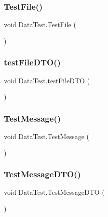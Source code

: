 \subsubsection{\texorpdfstring{Test\+File()}{TestFile()}}
{\footnotesize\ttfamily void Data\+Test.\+Test\+File (\begin{DoxyParamCaption}{ }\end{DoxyParamCaption})}

\mbox{\label{class_data_test_a8c0850346f6c9aaa3a4fabbc99a96d32}} 
\subsubsection{\texorpdfstring{test\+File\+D\+T\+O()}{testFileDTO()}}
{\footnotesize\ttfamily void Data\+Test.\+test\+File\+D\+TO (\begin{DoxyParamCaption}{ }\end{DoxyParamCaption})}

\mbox{\label{class_data_test_a6ed170bdf3a6b92d8d01bb98592e48fb}} 
\subsubsection{\texorpdfstring{Test\+Message()}{TestMessage()}}
{\footnotesize\ttfamily void Data\+Test.\+Test\+Message (\begin{DoxyParamCaption}{ }\end{DoxyParamCaption})}

\mbox{\label{class_data_test_a054c432b6518a387e0c8fa6d9b7c596e}} 
\subsubsection{\texorpdfstring{Test\+Message\+D\+T\+O()}{TestMessageDTO()}}
{\footnotesize\ttfamily void Data\+Test.\+Test\+Message\+D\+TO (\begin{DoxyParamCaption}{ }\end{DoxyParamCaption})}

